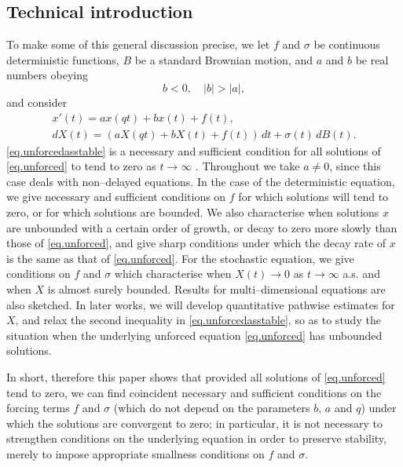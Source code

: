 \documentclass[a4paper,10pt,reqno]{amsart}
\numberwithin{equation}{section}
\theoremstyle{definition}
\theoremstyle{remark}
\DeclareMathOperator{\1}{\mathbbm 1}
\begin{document}
	\subsection{Technical introduction}
	To make some of this general discussion precise, we let $f$ and $\sigma$ be continuous deterministic functions, $B$ be a standard Brownian motion, and $a$ and $b$ be real numbers obeying 
	\begin{equation} \label{eq.unforcedasstable}
		b<0,  \quad |b|>|a|,
	\end{equation}
	and consider 
	\begin{gather*}
		x'(t)=ax(qt)+bx(t)+f(t),\\
		dX(t)=(aX(qt)+bX(t)+f(t))\,dt+\sigma(t)\,dB(t).
	\end{gather*}
	\eqref{eq.unforcedasstable} is a  necessary and sufficient condition for all solutions of \eqref{eq.unforced} to tend to zero as $t\to\infty$ \cite{KatoMc}. Throughout we take $a\neq 0$, since this case deals with non--delayed equations. In the case of the deterministic equation, we give necessary and sufficient conditions on $f$ for which solutions will tend to zero, or for which solutions are bounded. 
	We also characterise when solutions $x$ are unbounded with a certain order of growth, or decay to zero more slowly than those of \eqref{eq.unforced}, and give sharp conditions under which the decay rate of $x$ is the same as that of \eqref{eq.unforced}. For the stochastic equation, we give conditions on $f$ and $\sigma$ which characterise when $X(t)\to 0$ as $t\to\infty$ a.s. and when $X$ is almost surely bounded. Results for multi--dimensional equations are also sketched. In later works, we will develop quantitative pathwise estimates for $X$, and relax the second inequality in \eqref{eq.unforcedasstable}, so as to study the situation when the underlying unforced equation \eqref{eq.unforced} has unbounded solutions. 
	
	In short, therefore this paper shows that provided all solutions of \eqref{eq.unforced} tend to zero, we can find coincident necessary and sufficient conditions on the forcing terms $f$ and $\sigma$ (which do not depend on the parameters $b$, $a$ and $q$) under which the solutions are convergent to zero; in particular, it is not necessary to strengthen conditions on the underlying equation in order to preserve stability, merely to impose appropriate smallness conditions on $f$ and $\sigma$. 
	
\end{document}
